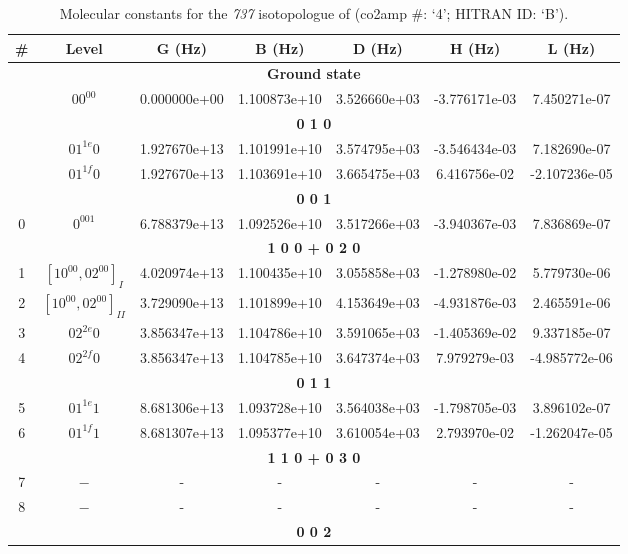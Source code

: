 \begin{table}[h!]
\caption{Molecular constants for the \textit{737} isotopologue of  (co2amp \#: ‘4’; HITRAN ID: ‘B’).}
\label{table:constants_737}
\centering
\begin{tabular}{|c|c|c|c|c|c|c|}
\hline
\textbf{\#} & \textbf{Level} & \textbf{G (Hz)} & \textbf{B (Hz)} & \textbf{D (Hz)} & \textbf{H (Hz)} & \textbf{L (Hz)} \\ \hline
\multicolumn{7}{|c|}{\textbf{Ground state}} \\ \hline
 & $00^00$ & 0.000000e+00 & 1.100873e+10 & 3.526660e+03 & -3.776171e-03 & 7.450271e-07 \\ \hline
\multicolumn{7}{|c|}{\textbf{0 1 0}} \\ \hline
 & $01^{1e}0$ & 1.927670e+13 & 1.101991e+10 & 3.574795e+03 & -3.546434e-03 & 7.182690e-07 \\ \hline
 & $01^{1f}0$ & 1.927670e+13 & 1.103691e+10 & 3.665475e+03 & 6.416756e-02 & -2.107236e-05 \\ \hline
\multicolumn{7}{|c|}{\textbf{0 0 1}} \\ \hline
0 & $0^001$ & 6.788379e+13 & 1.092526e+10 & 3.517266e+03 & -3.940367e-03 & 7.836869e-07 \\ \hline
\multicolumn{7}{|c|}{\textbf{1 0 0 + 0 2 0}} \\ \hline
1 & $[10^00, 02^00]_{I}$ & 4.020974e+13 & 1.100435e+10 & 3.055858e+03 & -1.278980e-02 & 5.779730e-06 \\ \hline
2 & $[10^00, 02^00]_{II}$ & 3.729090e+13 & 1.101899e+10 & 4.153649e+03 & -4.931876e-03 & 2.465591e-06 \\ \hline
3 & $02^{2e}0$ & 3.856347e+13 & 1.104786e+10 & 3.591065e+03 & -1.405369e-02 & 9.337185e-07 \\ \hline
4 & $02^{2f}0$ & 3.856347e+13 & 1.104785e+10 & 3.647374e+03 & 7.979279e-03 & -4.985772e-06 \\ \hline
\multicolumn{7}{|c|}{\textbf{0 1 1}} \\ \hline
5 & $01^{1e}1$ & 8.681306e+13 & 1.093728e+10 & 3.564038e+03 & -1.798705e-03 & 3.896102e-07 \\ \hline
6 & $01^{1f}1$ & 8.681307e+13 & 1.095377e+10 & 3.610054e+03 & 2.793970e-02 & -1.262047e-05 \\ \hline
\multicolumn{7}{|c|}{\textbf{1 1 0 + 0 3 0}} \\ \hline
7 & $-$ & - & - & - & - & - \\ \hline
8 & $-$ & - & - & - & - & - \\ \hline
\multicolumn{7}{|c|}{\textbf{0 0 2}} \\ \hline

\end{tabular}
\end{table}
